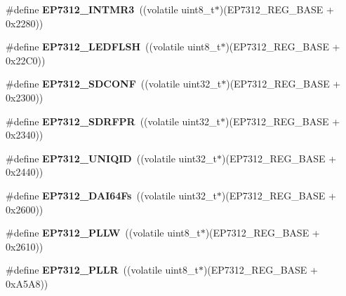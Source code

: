 \begin{DoxyCompactItemize}
\#define {\bfseries E\+P7312\+\_\+\+I\+N\+T\+M\+R3}~((volatile uint8\+\_\+t$\ast$)(E\+P7312\+\_\+\+R\+E\+G\+\_\+\+B\+A\+SE + 0x2280))
\item 
\mbox{\label{group__edb7312__registers_gaab30b28b046ed01995c04ba64d93501b}} 
\#define {\bfseries E\+P7312\+\_\+\+L\+E\+D\+F\+L\+SH}~((volatile uint8\+\_\+t$\ast$)(E\+P7312\+\_\+\+R\+E\+G\+\_\+\+B\+A\+SE + 0x22\+C0))
\item 
\mbox{\label{group__edb7312__registers_ga3032eeb99da00f4cdcc80f677525cba5}} 
\#define {\bfseries E\+P7312\+\_\+\+S\+D\+C\+O\+NF}~((volatile uint32\+\_\+t$\ast$)(E\+P7312\+\_\+\+R\+E\+G\+\_\+\+B\+A\+SE + 0x2300))
\item 
\mbox{\label{group__edb7312__registers_gabd962423cd59428c88ab69eecb560e90}} 
\#define {\bfseries E\+P7312\+\_\+\+S\+D\+R\+F\+PR}~((volatile uint32\+\_\+t$\ast$)(E\+P7312\+\_\+\+R\+E\+G\+\_\+\+B\+A\+SE + 0x2340))
\item 
\mbox{\label{group__edb7312__registers_ga6154d452f58eb27c68cc8dad4282c9f2}} 
\#define {\bfseries E\+P7312\+\_\+\+U\+N\+I\+Q\+ID}~((volatile uint32\+\_\+t$\ast$)(E\+P7312\+\_\+\+R\+E\+G\+\_\+\+B\+A\+SE + 0x2440))
\item 
\mbox{\label{group__edb7312__registers_ga90b21a37ec477e3db1b57042e9dd0f9c}} 
\#define {\bfseries E\+P7312\+\_\+\+D\+A\+I64\+Fs}~((volatile uint32\+\_\+t$\ast$)(E\+P7312\+\_\+\+R\+E\+G\+\_\+\+B\+A\+SE + 0x2600))
\item 
\mbox{\label{group__edb7312__registers_ga21bf942347aa23dc447d5c8501b0d0eb}} 
\#define {\bfseries E\+P7312\+\_\+\+P\+L\+LW}~((volatile uint8\+\_\+t$\ast$)(E\+P7312\+\_\+\+R\+E\+G\+\_\+\+B\+A\+SE + 0x2610))
\item 
\mbox{\label{group__edb7312__registers_gafef2572ab67c243ee0718ebc83ea6c87}} 
\#define {\bfseries E\+P7312\+\_\+\+P\+L\+LR}~((volatile uint8\+\_\+t$\ast$)(E\+P7312\+\_\+\+R\+E\+G\+\_\+\+B\+A\+SE + 0x\+A5\+A8))
\item 
\mbox{\label{group__edb7312__registers_ga6b06d3f86a20da8cb99fe0a6f431e225}} 

\end{DoxyCompactItemize}
